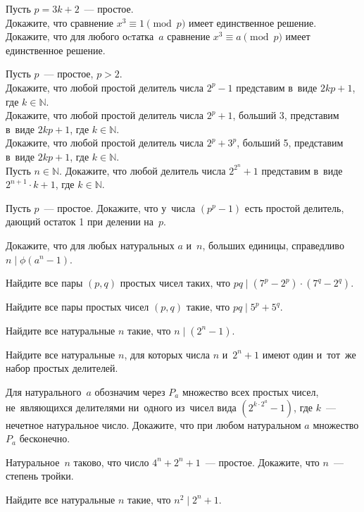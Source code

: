 \begin{problems}

\item
Пусть $p = 3 k + 2$~--- простое.
\\
\sp
Докажите, что сравнение $x^3 \equiv 1 \pmod{p}$ имеет единственное решение.
\\
\sp
Докажите, что для любого оcтатка~$a$ сравнение $x^3 \equiv a \pmod{p}$ имеет
единственное решение.

\item
Пусть $p$~--- простое, $p > 2$.
\\
\sp
Докажите, что любой простой делитель числа $2^p - 1$ представим
в~виде $2 k p + 1$, где $k \in \mathbb{N}$.
\\
\sp
Докажите, что любой простой делитель числа $2^p + 1$, больший 3, представим
в~виде $2 k p + 1$, где $k \in \mathbb{N}$.
\\
\sp
Докажите, что любой простой делитель числа $2^p + 3^p$, больший 5, представим
в~виде $2 k p + 1$, где $k \in \mathbb{N}$.
\\
\sp
Пусть $n \in \mathbb{N}$.
Докажите, что любой делитель числа $2^{2^n} + 1$ представим
в~виде $2^{n+1} \cdot k + 1$, где $k \in \mathbb{N}$.

\item
Пусть $p$~--- простое.
Докажите, что у~числа $(p^p - 1)$ есть простой делитель, дающий остаток 1 при
делении на~$p$.

\item
Докажите, что для любых натуральных $a$ и~$n$, больших единицы, справедливо
$n \mid \phi(a^n - 1)$.

\item
Найдите все пары $(p, q)$ простых чисел таких, что
$p q \mid (7^{p} - 2^{p}) \cdot (7^{q} - 2^{q})$.

\item
Найдите все пары простых чисел $(p, q)$ такие, что $p q \mid 5^{p} + 5^{q}$.

\item
Найдите все натуральные $n$ такие, что $n \mid (2^n - 1)$.

\item
Найдите все натуральные $n$, для которых числа $n$ и~$2^n + 1$ имеют один
и~тот~же набор простых делителей. 	

\item
Для натурального~$a$ обозначим через $P_a$ множество всех простых чисел,
не~являющихся делителями ни~одного из~чисел вида $(2^{k \cdot 2^a} - 1)$, где
$k$~--- нечетное натуральное число.
Докажите, что при любом натуральном $a$ множество $P_a$ бесконечно.

\item
Натуральное~$n$ таково, что число $4^n + 2^n + 1$~--- простое.
Докажите, что $n$~--- степень тройки. 

\item
Найдите все натуральные $n$ такие, что $n^2 \mid 2^n + 1$.

\end{problems}

